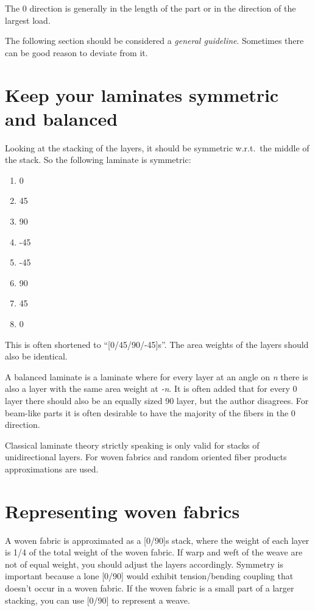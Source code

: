 \documentclass[a4paper,landscape,oneside,11pt,twocolumn]{memoir}
\begin{document}
The 0\textdegree{} direction is generally in the length of the part or in the
direction of the largest load.

The following section should be considered a \emph{general guideline}.
Sometimes there can be good reason to deviate from it.

\section{Keep your laminates symmetric and balanced} %

Looking at the stacking of the layers, it should be symmetric w.r.t.\ the
middle of the stack. So the following laminate is symmetric:

\begin{enumerate}
  \item 0\textdegree{}
  \item 45\textdegree{}
  \item 90\textdegree{}
  \item -45\textdegree{}
  \item -45\textdegree{}
  \item 90\textdegree{}
  \item 45\textdegree{}
  \item 0\textdegree{}
\end{enumerate}

This is often shortened to “[0/45/90/-45]s”. The area weights of the layers
should also be identical.

A balanced laminate is a laminate where for every layer at an angle on
\emph{n}\textdegree{} there is also a layer with the same area weight at \emph{-n}\textdegree.
It is often added that for every 0\textdegree{} layer there should also be an
equally sized 90\textdegree{} layer, but the author disagrees. For beam-like
parts it is often desirable to have the majority of the fibers in the
0\textdegree{} direction.

Classical laminate theory strictly speaking is only valid for stacks of
unidirectional layers. For woven fabrics and random oriented fiber products
approximations are used.


\section{Representing woven fabrics}

A woven fabric is approximated as a [0\textdegree/90\textdegree]s stack, where
the weight of each layer is 1/4 of the total weight of the woven fabric. If
warp and weft of the weave are not of equal weight, you should adjust the
layers accordingly. Symmetry is important because a lone
[0\textdegree/90\textdegree] would exhibit tension/bending coupling that
doesn't occur in a woven fabric.
If the woven fabric is a small part of a larger stacking, you can use
[0\textdegree/90\textdegree] to represent a weave.
\end{document}
